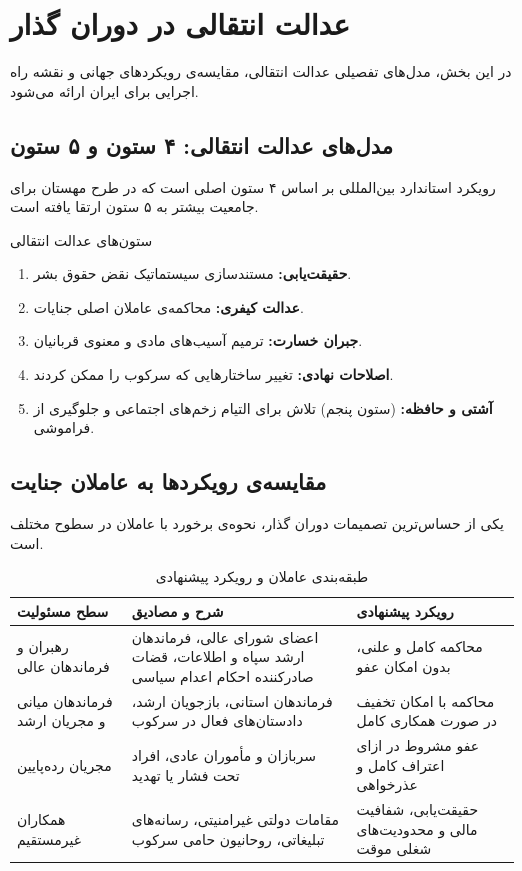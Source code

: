 \chapter{عدالت انتقالی در دوران گذار}
\label{app:justice}

در این بخش، مدل‌های تفصیلی عدالت انتقالی، مقایسه‌ی رویکردهای جهانی و نقشه راه اجرایی برای ایران ارائه می‌شود.

\section{مدل‌های عدالت انتقالی: ۴ ستون و ۵ ستون}

رویکرد استاندارد بین‌المللی بر اساس ۴ ستون اصلی است که در طرح مهستان برای جامعیت بیشتر به ۵ ستون ارتقا یافته است.

\begin{modernbox}{ستون‌های عدالت انتقالی}
\begin{enumerate}
    \item \textbf{حقیقت‌یابی:} مستندسازی سیستماتیک نقض حقوق بشر.
    \item \textbf{عدالت کیفری:} محاکمه‌ی عاملان اصلی جنایات.
    \item \textbf{جبران خسارت:} ترمیم آسیب‌های مادی و معنوی قربانیان.
    \item \textbf{اصلاحات نهادی:} تغییر ساختارهایی که سرکوب را ممکن کردند.
    \item \textbf{آشتی و حافظه:} (ستون پنجم) تلاش برای التیام زخم‌های اجتماعی و جلوگیری از فراموشی.
\end{enumerate}
\end{modernbox}

\section{مقایسه‌ی رویکردها به عاملان جنایت}

یکی از حساس‌ترین تصمیمات دوران گذار، نحوه‌ی برخورد با عاملان در سطوح مختلف است.

\begin{table}[htbp]
\centering
\caption{طبقه‌بندی عاملان و رویکرد پیشنهادی}
\begin{tabular}{R{4cm} L{6cm} R{4cm}}
\hline
\textbf{سطح مسئولیت} & \textbf{شرح و مصادیق} & \textbf{رویکرد پیشنهادی} \\
\hline
رهبران و فرماندهان عالی & اعضای شورای عالی، فرماندهان ارشد سپاه و اطلاعات، قضات صادرکننده احکام اعدام سیاسی & محاکمه کامل و علنی، بدون امکان عفو \\
فرماندهان میانی و مجریان ارشد & فرماندهان استانی، بازجویان ارشد، دادستان‌های فعال در سرکوب & محاکمه با امکان تخفیف در صورت همکاری کامل \\
مجریان رده‌پایین & سربازان و مأموران عادی، افراد تحت فشار یا تهدید & عفو مشروط در ازای اعتراف کامل و عذرخواهی \\
همکاران غیرمستقیم & مقامات دولتی غیرامنیتی، رسانه‌های تبلیغاتی، روحانیون حامی سرکوب & حقیقت‌یابی، شفافیت مالی و محدودیت‌های شغلی موقت \\
\hline
\end{tabular}
\end{table}

